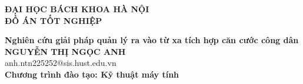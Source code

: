 \documentclass[DoAn.tex]{subfiles}
\begin{document}
\begin{titlepage}
\thispagestyle{empty}
\begin{center}

{\textbf{\large{ĐẠI HỌC BÁCH KHOA HÀ NỘI}}}\\[4cm]

{\textbf{\huge{ ĐỒ ÁN TỐT NGHIỆP}}}\\[1cm]
{\textbf{\Large{Nghiên cứu giải pháp quản lý ra vào từ xa tích hợp căn cước công dân}}\\[1cm]

{\textbf{\large{NGUYỄN THỊ NGỌC ANH}}}\\
{\large{anh.ntn225252@sis.hust.edu.vn}}\\[0.5cm]

{\textbf{\large{Chương trình đào tạo: Kỹ thuật máy tính
}}}\\

\vspace{4cm}
\begin{table}[H]
\centering
{}
\end{table}}
\end{center}



\end{titlepage}
\end{document}
